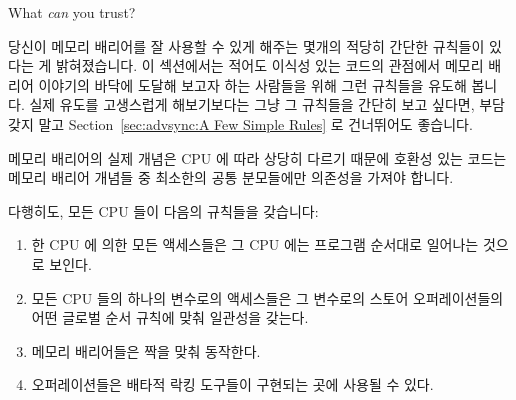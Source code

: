 What \emph{can} you trust?
\fi

당신이 메모리 배리어를 잘 사용할 수 있게 해주는 몇개의 적당히 간단한 규칙들이
있다는 게 밝혀졌습니다.
이 섹션에서는 적어도 이식성 있는 코드의 관점에서 메모리 배리어 이야기의 바닥에
도달해 보고자 하는 사람들을 위해 그런 규칙들을 유도해 봅니다.
실제 유도를 고생스럽게 해보기보다는 그냥 그 규칙들을 간단히 보고 싶다면, 부담
갖지 말고 Section~\ref{sec:advsync:A Few Simple Rules} 로 건너뛰어도 좋습니다.

메모리 배리어의 실제 개념은 CPU 에 따라 상당히 다르기 때문에 호환성 있는 코드는
메모리 배리어 개념들 중 최소한의 공통 분모들에만 의존성을 가져야 합니다.

다행히도, 모든 CPU 들이 다음의 규칙들을 갖습니다:
\begin{enumerate}
\item	한 CPU 에 의한 모든 액세스들은 그 CPU 에는 프로그램 순서대로 일어나는
	것으로 보인다.
\item	모든 CPU 들의 하나의 변수로의 액세스들은 그 변수로의 스토어
	오퍼레이션들의 어떤 글로벌 순서 규칙에 맞춰 일관성을 갖는다.
\item	메모리 배리어들은 짝을 맞춰 동작한다.
\item	오퍼레이션들은 배타적 락킹 도구들이 구현되는 곳에 사용될 수 있다.
\end{enumerate}

